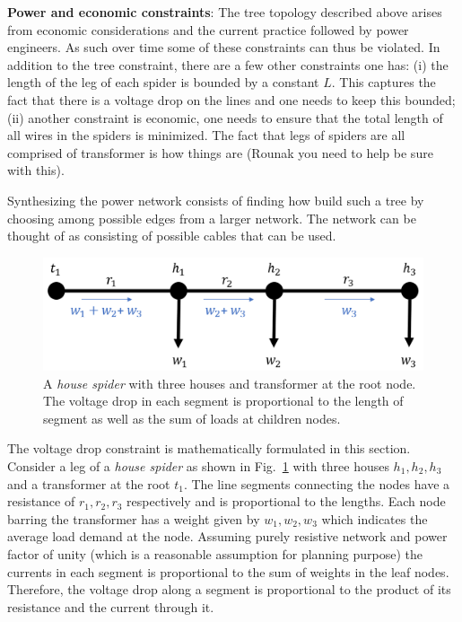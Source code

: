 \documentclass[11pt,letterpaper]{article}
\begin{document}
\noindent
\textbf{Power and economic constraints}: The tree topology described above arises from economic considerations and the current practice followed by power engineers. As such over time some of these constraints can thus be violated.  In addition to the tree constraint, there are a few other constraints one has: (i) the length of the leg of each spider is bounded by a constant $L$. This captures the fact that there is a voltage drop on
the lines and one needs to keep this bounded; (ii) another constraint is economic, one needs to ensure that the total length of all wires in the spiders is minimized. The fact that legs of spiders are all comprised of transformer is how things are (Rounak you need to help be sure with this).

Synthesizing the power network consists of finding how build such a tree by choosing among possible edges from a larger network. The network
can be thought of as consisting of possible cables that can be used. 

\color{blue} 
\begin{figure}
	\centering
	\includegraphics[width=\textwidth]{constraint-1}
	\caption{\color{blue}A \emph{house spider} with three houses and transformer at the root node. The voltage drop in each segment is proportional to the length of segment as well as the sum of loads at children nodes.}
	\label{fig-1}
\end{figure}
The voltage drop constraint is mathematically formulated in this section. Consider a leg of a \emph{house spider} as shown in Fig.~\ref{fig-1} with three houses $h_1,h_2,h_3$ and a transformer at the root $t_1$. The line segments connecting the nodes have a resistance of $r_1,r_2,r_3$ respectively and is proportional to the lengths. Each node barring the transformer has a weight given by $w_1,w_2,w_3$ which indicates the average load demand at the node. Assuming purely resistive network and power factor of unity (which is a reasonable assumption for planning purpose) the currents in each segment is proportional to the sum of weights in the leaf nodes. Therefore, the voltage drop along a segment is proportional to the product of its resistance and the current through it.
\end{document}
